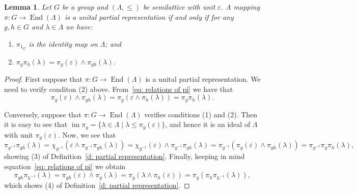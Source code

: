 \documentclass{amsart}
\newcommand{\0}{{\vartheta}}
\newtheorem{lem}[thm]{Lemma}
\theoremstyle{definition}
\theoremstyle{remark}
\numberwithin{equation}{section}
\newtheorem*{Theorem A}{\textbf{Theorem A}}
\newtheorem*{Corollary E}{\textbf{Corollary E}}
\newtheorem*{Corollary F}{\textbf{Corollary F}}
\newtheorem*{Theorem B}{\textbf{Theorem B}}
\newtheorem*{Theorem C}{\textbf{Theorem C}}
\newtheorem*{Theorem D}{\textbf{Theorem B}}
\newtheorem*{p a}{\textbf{Proof of  Theorem A}}
\newtheorem*{p b}{\textbf{Proof of Theorem B}}
\newtheorem*{p c}{\textbf{Proof of  Theorem C}}
\newtheorem*{p d}{\textbf{Proof of  Theorem D}}
\DeclareMathOperator{\im}{im}
\DeclareMathOperator{\en}{End}
\begin{document}
\begin{lem}\label{l: f-pairs} Let \(G\) be a group and \((\Lambda,\leq)\) be semilattice with unit $\varepsilon$.  A  mapping \(\pi: G \to \en(\Lambda)\) is a unital partial representation if and only if  for any $g,h\in G$ and $\lambda\in \Lambda$ we have:
\begin{enumerate}
\item $\pi_{1_G}$ is the identity map on $\Lambda$; and 
\item $\pi_g\pi_h(\lambda)=\pi_g(\varepsilon)\wedge \pi_{gh}(\lambda).$
\end{enumerate}
\end{lem}
\begin{proof}
First suppose that \(\pi: G \to \en(\Lambda)\) is a unital partial representation. We need to verify conditon (2) above. From~\eqref{eq: relations of pi} we have that 
$$\pi_g (\varepsilon)\wedge\pi_{gh}(\lambda)=\pi_g(\varepsilon\wedge\pi_{h}(\lambda))=\pi_g\pi_{h}(\lambda).$$

Conversely, suppose that \(\pi: G \to \en(\Lambda)\) verifies conditions (1) and (2). Then it is easy to see that $\im\pi_g=\{\lambda\in \Lambda\mid \lambda\leq \pi_g(\varepsilon) \}$, and hence it is an ideal of $\Lambda$ with unit $\pi_g(\varepsilon).$ Now, we see that
$$\pi_{g^{-1}}\pi_{gh}(\lambda)=\chi_{g^{-1}}(\varepsilon\wedge \pi_{g^{-1}}\pi_{gh}(\lambda))=\chi_{g^{-1}}(\varepsilon)\wedge \pi_{g^{-1}}\pi_{gh}(\lambda)=\pi_{g^{-1}}(\pi_g(\varepsilon)\wedge \pi_{gh}(\lambda))=\pi_{g^{-1}}\pi_g\pi_h(\lambda),$$
showing (3) of Definition~\ref{d: partial representation}. Finally, keeping in mind equation~\eqref{eq: relations of pi} we obtain
$$\pi_{gh}\pi_{h^{-1}}(\lambda)=\pi_{gh}(\varepsilon)\wedge \pi_g(\lambda)=\pi_g(\lambda\wedge \pi_h(\varepsilon))=\pi_g(\pi_h\pi_{h^{-1}}(\lambda)),$$
which shows (4) of Definition~\ref{d: partial representation}.
\end{proof}
\end{document}

